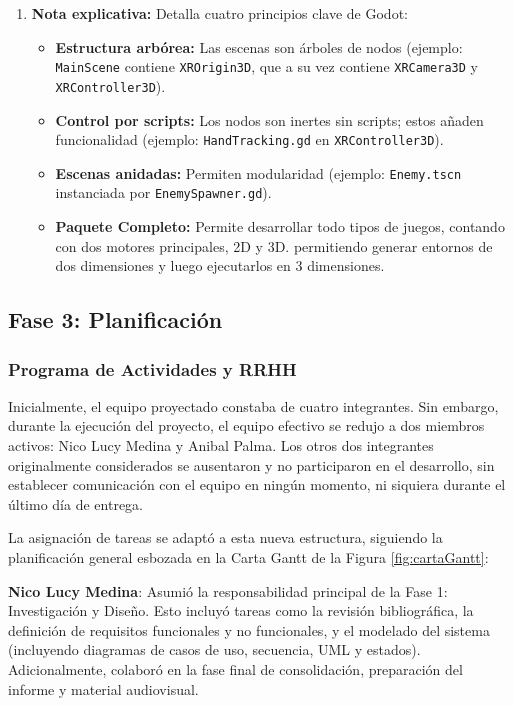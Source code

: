 \documentclass[journal,article,accept,pdftex,moreauthors]{Definitions/mdpi}
\begin{document}
\begin{enumerate}
    \item \textbf{Nota explicativa:} Detalla cuatro principios clave de Godot:
    \begin{itemize}
        \item \textbf{Estructura arbórea:} Las escenas son árboles de nodos (ejemplo: \texttt{MainScene} contiene \texttt{XROrigin3D}, que a su vez contiene \texttt{XRCamera3D} y \texttt{XRController3D}).
        \item \textbf{Control por scripts:} Los nodos son inertes sin scripts; estos añaden funcionalidad (ejemplo: \texttt{HandTracking.gd} en \texttt{XRController3D}).
        \item \textbf{Escenas anidadas:} Permiten modularidad (ejemplo: \texttt{Enemy.tscn} instanciada por \texttt{EnemySpawner.gd}).
        \item \textbf{Paquete Completo:} Permite desarrollar todo tipos de juegos, contando con dos motores principales, 2D y 3D. permitiendo generar entornos de dos dimensiones y luego ejecutarlos en 3 dimensiones.
    \end{itemize}
\end{enumerate}




\subsection{Fase 3: Planificación}

\subsubsection{Programa de Actividades y RRHH}
Inicialmente, el equipo proyectado constaba de cuatro integrantes. Sin embargo, durante la ejecución del proyecto, el equipo efectivo se redujo a dos miembros activos: Nico Lucy Medina y Anibal Palma. Los otros dos integrantes originalmente considerados se ausentaron y no participaron en el desarrollo, sin establecer comunicación con el equipo en ningún momento, ni siquiera durante el último día de entrega.

La asignación de tareas se adaptó a esta nueva estructura, siguiendo la planificación general esbozada en la Carta Gantt de la Figura \ref{fig:cartaGantt}:

\textbf{Nico Lucy Medina}: Asumió la responsabilidad principal de la Fase 1: Investigación y Diseño. Esto incluyó tareas como la revisión bibliográfica, la definición de requisitos funcionales y no funcionales, y el modelado del sistema (incluyendo diagramas de casos de uso, secuencia, UML y estados). Adicionalmente, colaboró en la fase final de consolidación, preparación del informe y material audiovisual.
\end{document}
